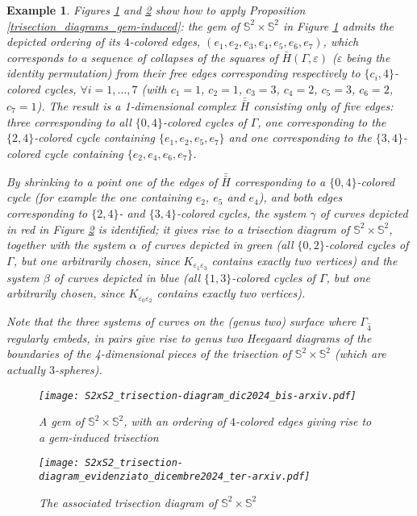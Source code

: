 \documentclass[12pt,a4paper]{article}
\newtheorem{example}{Example}
\newcommand{\e}{\varepsilon}
\newcommand{\G}{\Gamma}
\begin{document}
\begin{example}
{\em Figures \ref{fig:S^xS^2} and \ref{fig:S^xS^2_trisection-diagram} show how to apply Proposition \ref{trisection_diagrams_gem-induced}: the gem of $\mathbb S^2 \times \mathbb S^2$ in Figure \ref{fig:S^xS^2} admits the depicted ordering of its $4$-colored edges, $(e_1, e_2, e_3, e_4, e_5, e_6, e_7)$,  which corresponds to a sequence of collapses of the squares of $\bar H(\G, \e)$ ($\e$ being the identity permutation) from their free edges corresponding respectively to $\{c_i,4\}$-colored cycles, $\forall i = 1, \dots, 7$ (with $c_1=1$, $c_2=1$, $c_3=3$, $c_4=2$, $c_5=3$, $c_6=2$, $c_7=1$). The result is a 1-dimensional complex $\bar{\bar H}$ consisting only of five edges: three corresponding to all $\{0,4\}$-colored cycles of $\Gamma$, one corresponding to the $\{2,4\}$-colored cycle containing $\{e_1, e_2, e_5, e_7\}$ and one corresponding to the $\{3,4\}$-colored cycle containing $\{e_2, e_4, e_6, e_7\}$. 

By shrinking to a point one of the edges of $\bar{\bar H}$ corresponding to a $\{0,4\}$-colored cycle (for example the one containing $e_2$, $e_5$ and $e_4$), and both edges corresponding to $\{2,4\}$- and $\{3,4\}$-colored cycles, the system $\gamma$ of curves depicted in red in Figure \ref{fig:S^xS^2_trisection-diagram} 
is identified; it gives rise to a trisection diagram of $\mathbb S^2 \times \mathbb S^2$, together with the system $\alpha$ of curves depicted in green (all $\{0,2\}$-colored cycles of $\Gamma$, but one arbitrarily chosen, since $K_{\e_1 \e_3}$ 
contains exactly two vertices) and the system $\beta$ of curves depicted in 
blue (all $\{1,3\}$-colored cycles of $\Gamma$, but one arbitrarily chosen, since $K_{\e_0 \e_2}$ contains exactly two vertices).  

Note that the three systems of curves on the (genus two) surface where $\G_{\hat 4}$ regularly embeds, in pairs give rise to genus two Heegaard diagrams of the boundaries of the 4-dimensional pieces of the trisection of $\mathbb S^2 \times \mathbb S^2$ (which are actually $3$-spheres). 

\begin{figure} [ht]  %
    \centering
    \texttt{[image: S2xS2\_trisection-diagram\_dic2024\_bis-arxiv.pdf]}
   \caption{A gem of $\mathbb S^2 \times \mathbb S^2$, with an ordering of $4$-colored edges giving rise to a gem-induced trisection}
   \label{fig:S^xS^2}
\end{figure}


\begin{figure} [ht]  %
    \centering
    \texttt{[image: S2xS2\_trisection-diagram\_evidenziato\_dicembre2024\_ter-arxiv.pdf]}
    \caption{The associated trisection diagram  of $\mathbb S^2 \times \mathbb S^2$}
   \label{fig:S^xS^2_trisection-diagram}
\end{figure}

}
\end{example}
\end{document}

